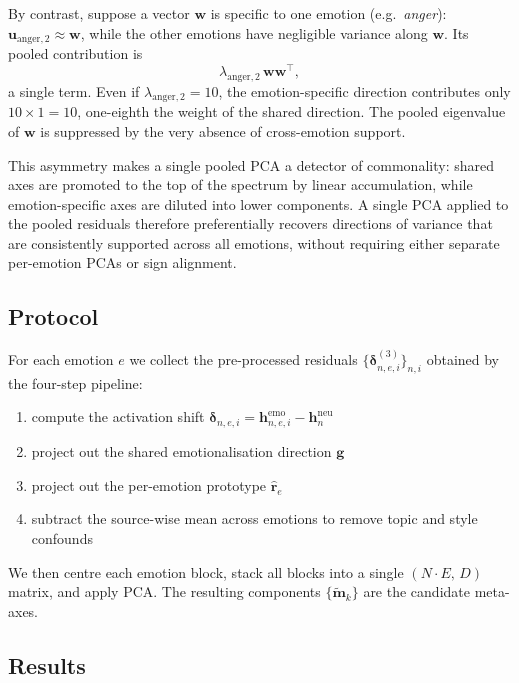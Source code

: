 By contrast, suppose a vector $\mathbf{w}$ is specific to one emotion (e.g.\ \textit{anger}):
$\mathbf{u}_{\mathrm{anger},2} \approx \mathbf{w}$, while the other emotions have negligible variance along $\mathbf{w}$. Its pooled contribution is
\[
\lambda_{\mathrm{anger},2}\,\mathbf{w}\mathbf{w}^\top,
\]
a single term. Even if $\lambda_{\mathrm{anger},2} = 10$, the emotion-specific direction contributes only $10 \times 1 = 10$, one-eighth the weight of the shared direction. The pooled eigenvalue of $\mathbf{w}$ is suppressed by the very absence of cross-emotion support.\par

This asymmetry makes a single pooled PCA a detector of commonality: shared axes are promoted to the top of the spectrum by linear accumulation, while emotion-specific axes are diluted into lower components. A single PCA applied to the pooled residuals therefore preferentially recovers directions of variance that are consistently supported across all emotions, without requiring either separate per-emotion PCAs or sign alignment.\par

\subsection{Protocol}

For each emotion $e$ we collect the pre-processed residuals $\{\boldsymbol{\delta}^{(3)}_{n,e,i}\}_{n,i}$ obtained by the four-step pipeline:
\begin{enumerate}
  \item compute the activation shift $\boldsymbol{\delta}_{n,e,i} = \mathbf{h}^{\mathrm{emo}}_{n,e,i} - \mathbf{h}^{\mathrm{neu}}_{n}$
  \item project out the shared emotionalisation direction $\mathbf{g}$
  \item project out the per-emotion prototype $\hat{\mathbf{r}}_e$
  \item subtract the source-wise mean across emotions to remove topic and style confounds
\end{enumerate}

We then centre each emotion block, stack all blocks into a single $(N \cdot E,\, D)$ matrix, and apply PCA. The resulting components $\{\tilde{\mathbf{m}}_k\}$ are the candidate meta-axes.\par

\subsection{Results}

